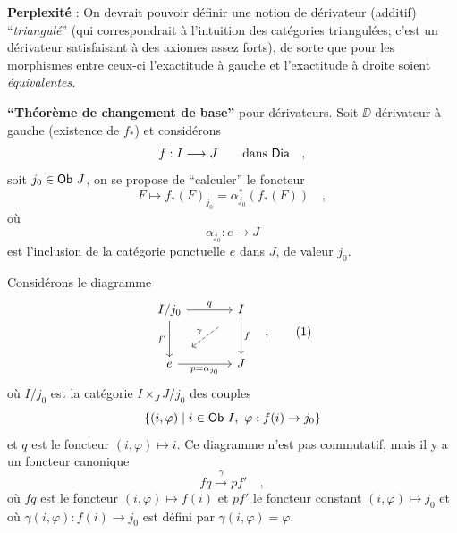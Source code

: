 \textbf{Perplexité} : On devrait pouvoir définir une notion de dérivateur (additif) “\textit{triangulé}” (qui correspondrait à l'intuition des catégories triangulées; c'est un dérivateur satisfaisant à des axiomes assez forts), de sorte que pour les morphismes entre ceux-ci l'exactitude à gauche et l'exactitude à droite soient \textit{équivalentes.}

\textbf{“Théorème de changement de base”} pour dérivateurs. Soit $\DD$ dérivateur à gauche (existence de $f_*$) et considérons
\[ f : I \longrightarrow J \qquad \text{dans } \mathsf{Dia} \quad , \]
soit $j_0 \in \mathsf{Ob}\ J$, on se propose de “calculer” le foncteur
\[ F \mapsto f_*(F)_{j_0} = \alpha^*_{j_0}(f_*(F)) \quad , \]
où
\[ \alpha_{j_0} : e \longrightarrow J \]
est l'inclusion de la catégorie ponctuelle $e$ dans $J$, de valeur $j_0$.

Considérons le diagramme
\[
\begin{tikzcd}[row sep=large, column sep=large]
I/j_0 \arrow[r, "q"] \arrow[d, "f'"'] & I \arrow[d, "f"] \\
e \arrow[r, "p = \alpha_{j_0}"'] & J
\arrow[from=1-2, to=2-1, dashed, shorten <=14pt, shorten >=14pt, "\gamma"']
\end{tikzcd}
\quad ,
\tag*{(1)}
\]
où $I/j_0$ est la catégorie $I \times_J J/j_0$ des couples
\[ \{(i,\varphi) \mid i \in \sOb\ I,\ \varphi : f(i) \to j_0\} \]
et $q$ est le foncteur $(i,\varphi) \mapsto i$. Ce diagramme n'est pas commutatif, mais il y a un foncteur canonique
\[ fq \xrightarrow{\gamma} pf' \quad , \]
où $fq$ est le foncteur $(i,\varphi) \mapsto f(i)$ et $pf'$ le foncteur constant $(i,\varphi) \mapsto j_0$ et où $\gamma(i,\varphi) : f(i) \to j_0$ est défini par $\gamma(i,\varphi) = \varphi$.

